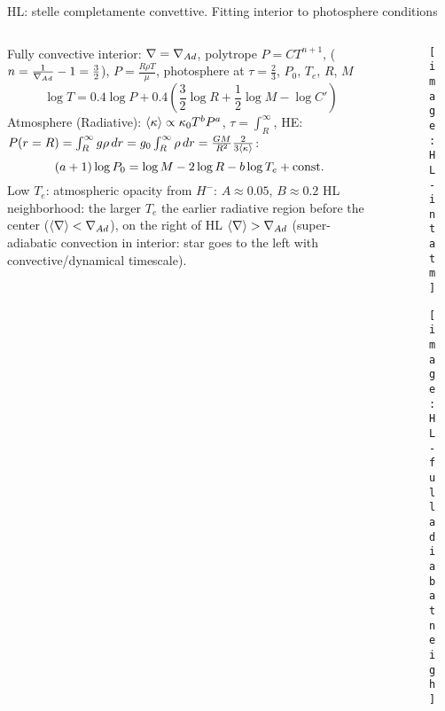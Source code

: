 \begin{frame}[fragile]{HL: stelle completamente convettive. Fitting interior to photosphere conditions}
	\begin{columns}[T]
		\begin{column}{0.5\textwidth}
			Fully convective interior: $\nabla=\nabla_{Ad}$, polytrope $P=CT^{n+1}$, ($n=\frac{1}{\nabla_{Ad}}-1=\frac{3}{2}$), $P=\frac{R\rho T}{\mu}$, photosphere at $\tau=\frac{2}{3}$, $P_0$, $T_e$, $R$, $M$
			\[\log{T}=0.4\log{P}+0.4(\frac{3}{2}\log{R}+\frac{1}{2}\log{M}-\log{C'})\]
			Atmosphere (Radiative): $\langle \kappa \rangle\propto\kappa_0T^bP^a$, $\tau=\int_R^{\infty}$, HE: $P(r=R)=\int_R^{\infty}g\rho\,dr=g_0\int_R^{\infty}\rho\,dr=\frac{GM}{R^2}\frac{2}{3\langle \kappa \rangle}$:
			\[(a+1)\log{P_0}=\log{M}-2\log{R}-b\log{T_e}+\operatorname{const.}{}\]
			Low $T_e$: atmospheric opacity from $H^-$: $A\approx0.05$, $B\approx0.2$
			HL neighborhood: the larger $T_e$ the earlier radiative region before the center ($\langle \nabla \rangle<\nabla_{Ad}$), on the right of HL $\langle \nabla \rangle>\nabla_{Ad}$ (super-adiabatic convection in interior: star goes to the left with convective/dynamical timescale).	
		\end{column}
		\begin{column}{0.45\textwidth}
			\begin{figure}[!ht]\texttt{[image: HL-intatm]}\label{fig:HL-intatm}
			\end{figure}
			\begin{figure}[!ht]\texttt{[image: HL-fulladiabatneigh]}\label{fig:HL-fulladiabatneigh}
		\end{figure}
		\end{column}
	\end{columns}
\end{frame}

